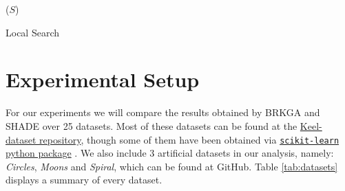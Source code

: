 \documentclass[review]{elsarticle}
\begin{document}
\begin{algorithm}
	\SetNlSkip{0.5em}
	\BlankLine
	\BlankLine
	\KwRet ($S$)
	
\caption{Local Search}\label{alg:LS}
\end{algorithm}

\clearpage

\section{Experimental Setup}

For our experiments we will compare the results obtained by BRKGA and SHADE over 25 datasets. Most of these datasets can be found at the \href{https://sci2s.ugr.es/keel/category.php?cat=clas}{Keel-dataset repository}\cite{triguero2017keel}, though some of them have been obtained via
\href{https://scikit-learn.org/stable/datasets/index.html}{\texttt{scikit-learn} python package} \cite{scikit-learn}. We also include 3 artificial datasets in our analysis, namely: \textit{Circles}, \textit{Moons} and \textit{Spiral}, which can be found at GitHub. Table \ref{tab:datasets} displays a summary of every dataset. 
\end{document}

